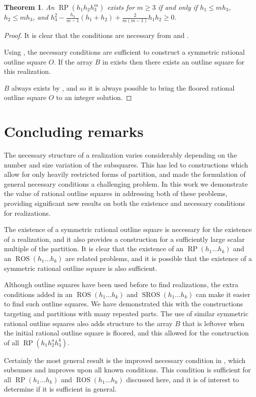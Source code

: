 \documentclass[preprint,nonatbib]{elsarticle}
\DeclareMathOperator{\LS}{RP}
\DeclareMathOperator{\ROS}{ROS}
\DeclareMathOperator{\SROS}{SROS}
\newtheorem{theorem}{Theorem}[section]
\theoremstyle{definition}
\numberwithin{equation}{section}
\begin{document}
\begin{theorem}
    An $\LS(h_1h_2h_3^m)$ exists for $m\geq 3$ if and only if $h_1\leq mh_3$, $h_2\leq mh_3$, and $h_3^2 - \frac{h_3}{m-1}(h_1+h_2) + \frac{2}{m(m-1)}h_1h_2 \geq 0$.
\end{theorem}
\begin{proof}

    It is clear that the conditions are necessary from  and .

    Using , the necessary conditions are sufficient to construct a symmetric rational outline square $O$. If the array $B$ in  exists then there exists an outline square for this realization.

    $B$ always exists by , and so it is always possible to bring the floored rational outline square $O$ to an integer solution.
\end{proof}


\section{Concluding remarks}

The necessary structure of a realization varies considerably depending on the number and size variation of the subsquares. This has led to constructions which allow for only heavily restricted forms of partition, and made the formulation of general necessary conditions a challenging problem. In this work we demonstrate the value of rational outline squares in  addressing both of these problems, providing significant new results on both the existence and necessary conditions for realizations.

The existence of a symmetric rational outline square is necessary for the existence of a realization, and it also provides a construction for a sufficiently large scalar multiple of the partition. It is clear that the existence of an $\LS(h_1\dots h_k)$ and an $\ROS(h_1\dots h_k)$ are related problems, and it is possible that the existence of a symmetric rational outline square is also sufficient.

Although outline squares have been used before to find realizations, the extra conditions added in an $\ROS(h_1\dots h_k)$ and $\SROS(h_1\dots h_k)$ can make it easier to find such outline squares. We have demonstrated this with the constructions targeting  and partitions with many repeated parts. The use of similar symmetric rational outline squares also adds structure to the array $B$ that is leftover when the initial rational outline square is floored, and this allowed for the construction of all $\LS(h_1h_2^ah_3^b)$.

Certainly the most general result is the improved necessary condition in , which subsumes and improves upon all known conditions. This condition is sufficient for all $\LS(h_1\dots h_k)$ and $\ROS(h_1\dots h_k)$ discussed here, and it is of interest to determine if it is sufficient in general.




\printbibliography
\end{document}
